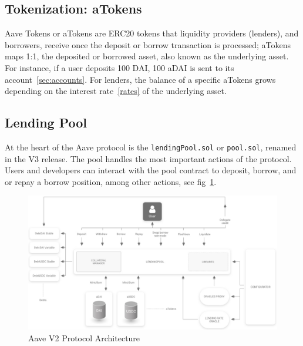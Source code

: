 \documentclass[11pt,a4paper]{report}
\begin{document}
\subsection{Tokenization: aTokens}\label{atokens}
Aave Tokens or aTokens\cite{aaveV1aToken}\cite{aaveV2debtToken} are ERC20 tokens that liquidity providers (lenders), and borrowers, receive once the deposit or borrow transaction is processed; aTokens maps 1:1, the deposited or borrowed asset, also known as the underlying asset. For instance, if a user deposits 100 DAI, 100 aDAI is sent to its account~\ref{sec:accounts}. For lenders, the balance of a specific aTokens grows depending on the interest rate~\ref{rates} of the underlying asset. 
\subsection{Lending Pool}
At the heart of the Aave protocol is the \verb|lendingPool.sol| or \verb|pool.sol|, renamed in the V3\cite{aaveV3} release. The pool handles the most important actions of the protocol. Users and developers can interact with the pool contract to deposit, borrow, and or repay a borrow position, among other actions, see fig~\ref{fig:pool_arch}. 
\begin{figure}[htp]
	\centering
	\includegraphics[width=1\textwidth]{./images/pool_arch}
	\caption{Aave V2 Protocol Architecture\cite{aaveV2}}
	\label{fig:pool_arch}
\end{figure}
\end{document}

